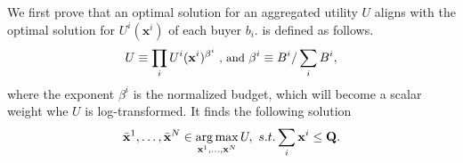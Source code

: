 \documentclass[conference]{IEEEtran}
\theoremstyle{plain}
\DeclareMathOperator*{\argmax}{arg\,max}
\newcommand*{\defeq}{\equiv}
\begin{document}
We first prove that an optimal solution for an aggregated utility $U$ aligns with the optimal solution for $U^i(\mathbf{x}^i)$ of each buyer $b_i$.  is defined as follows.
\begin{equation}\small
    U \defeq \prod_i U^i(\mathbf{x}^i)^{\beta^i} \text{ , and } \beta^i\defeq B^i/\sum_i B^i,
\end{equation}  
where the exponent $\beta^i$ is the normalized budget, which will become a scalar weight whe $U$ is log-transformed. It finds the following solution
\begin{equation}\small
    \label{eqn:maximal-solution}
     \bar{\mathbf{x}}^1,\ldots, \bar{\mathbf{x}}^N \in \argmax_{\mathbf{x}^1,\ldots, \mathbf{x}^N} U,\,\,s.t. \sum_i\mathbf{x}^i\leq \mathbf{Q}.
\end{equation}
\end{document}
